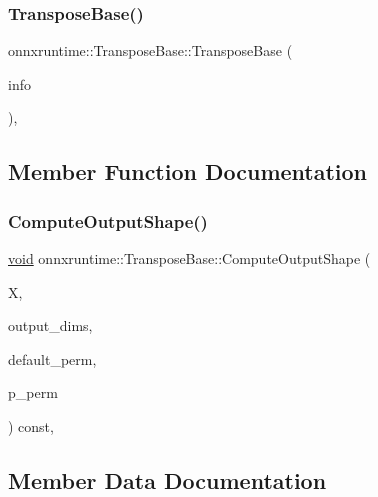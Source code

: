 \subsubsection{\texorpdfstring{Transpose\+Base()}{TransposeBase()}}
{\footnotesize\ttfamily onnxruntime\+::\+Transpose\+Base\+::\+Transpose\+Base (\begin{DoxyParamCaption}\item[{const \mbox{\hyperlink{classonnxruntime_1_1OpKernelInfo}{Op\+Kernel\+Info}} \&}]{info }\end{DoxyParamCaption})\hspace{0.3cm}{\ttfamily [inline]}, {\ttfamily [protected]}}



\subsection{Member Function Documentation}
\mbox{\label{classonnxruntime_1_1TransposeBase_a7fefe794b110fe706187c25dae4f0b74}} 
\subsubsection{\texorpdfstring{Compute\+Output\+Shape()}{ComputeOutputShape()}}
{\footnotesize\ttfamily \mbox{\hyperlink{mlasi_8h_a88f941d423cb2a819b70a1358982b1a6}{void}} onnxruntime\+::\+Transpose\+Base\+::\+Compute\+Output\+Shape (\begin{DoxyParamCaption}\item[{const \mbox{\hyperlink{classonnxruntime_1_1Tensor}{Tensor}} \&}]{X,  }\item[{std\+::vector$<$ int64\+\_\+t $>$ \&}]{output\+\_\+dims,  }\item[{std\+::vector$<$ int64\+\_\+t $>$ \&}]{default\+\_\+perm,  }\item[{const std\+::vector$<$ int64\+\_\+t $>$ $\ast$\&}]{p\+\_\+perm }\end{DoxyParamCaption}) const\hspace{0.3cm}{\ttfamily [inline]}, {\ttfamily [protected]}}



\subsection{Member Data Documentation}
\mbox{\label{classonnxruntime_1_1TransposeBase_a13bfaf981fd59875af221183e642b21d}} 
